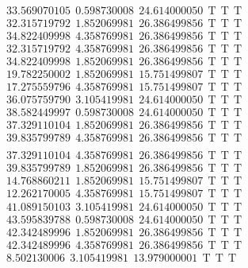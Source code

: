 \documentclass[10pt,a4paper]{article}
\begin{document}
\begin{itemize}
\begin{displaymath}
{\begin{aligned}
&33.569070105 ~~   0.598730008 ~~  24.614000050  ~~\mathrm{T  ~~ T  ~~ T } \\ 
&32.315719792 ~~   1.852069981 ~~  26.386499856  ~~\mathrm{T  ~~ T  ~~ T } \\ 
&34.822409998 ~~   4.358769981 ~~  26.386499856  ~~\mathrm{T  ~~ T  ~~ T } \\ 
&32.315719792 ~~   4.358769981 ~~  26.386499856  ~~\mathrm{T  ~~ T  ~~ T } \\ 
&34.822409998 ~~   1.852069981 ~~  26.386499856  ~~\mathrm{T  ~~ T  ~~ T } \\ 
&19.782250002 ~~   1.852069981 ~~  15.751499807  ~~\mathrm{T  ~~ T  ~~ T } \\ 
&17.275559796 ~~   4.358769981 ~~  15.751499807  ~~\mathrm{T  ~~ T  ~~ T } \\ 
&36.075759790 ~~   3.105419981 ~~  24.614000050  ~~\mathrm{T  ~~ T  ~~ T } \\ 
&38.582449997 ~~   0.598730008 ~~  24.614000050  ~~\mathrm{T  ~~ T  ~~ T } \\ 
&37.329110104 ~~   1.852069981 ~~  26.386499856  ~~\mathrm{T  ~~ T  ~~ T } \\ 
&39.835799789 ~~   4.358769981 ~~  26.386499856  ~~\mathrm{T  ~~ T  ~~ T } \\ 
				\end{aligned}
			}
		\end{displaymath}
		\begin{displaymath}
			\boxed{
				\begin{aligned}
&37.329110104 ~~   4.358769981 ~~  26.386499856  ~~\mathrm{T  ~~ T  ~~ T } \\ 
&39.835799789 ~~   1.852069981 ~~  26.386499856  ~~\mathrm{T  ~~ T  ~~ T } \\ 
&14.768860211 ~~   1.852069981 ~~  15.751499807  ~~\mathrm{T  ~~ T  ~~ T } \\ 
&12.262170005 ~~   4.358769981 ~~  15.751499807  ~~\mathrm{T  ~~ T  ~~ T } \\ 
&41.089150103 ~~   3.105419981 ~~  24.614000050  ~~\mathrm{T  ~~ T  ~~ T } \\ 
&43.595839788 ~~   0.598730008 ~~  24.614000050  ~~\mathrm{T  ~~ T  ~~ T } \\ 
&42.342489996 ~~   1.852069981 ~~  26.386499856  ~~\mathrm{T  ~~ T  ~~ T } \\ 
&42.342489996 ~~   4.358769981 ~~  26.386499856  ~~\mathrm{T  ~~ T  ~~ T } \\ 
& 8.502130006 ~~   3.105419981 ~~  13.979000001  ~~\mathrm{T  ~~ T  ~~ T } \\ 

\end{aligned}}
\end{displaymath}
\end{itemize}
\end{document}
